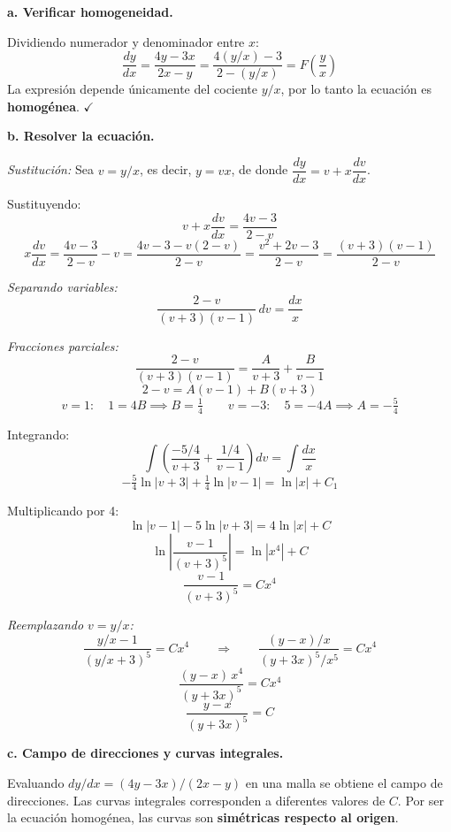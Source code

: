\begin{respuesta}

\textbf{a. Verificar homogeneidad.}

Dividiendo numerador y denominador entre $x$:
\[
    \frac{dy}{dx} = \frac{4y - 3x}{2x - y}
    = \frac{4(y/x) - 3}{2 - (y/x)}
    = F\!\left(\frac{y}{x}\right)
\]
La expresión depende únicamente del cociente $y/x$, por lo tanto
la ecuación es \textbf{homogénea}. $\checkmark$

\medskip
\textbf{b. Resolver la ecuación.}

\textit{Sustitución:} Sea $v = y/x$, es decir, $y = vx$, de donde
$\dfrac{dy}{dx} = v + x\dfrac{dv}{dx}$.

Sustituyendo:
\[
    v + x\frac{dv}{dx} = \frac{4v - 3}{2 - v}
\]
\[
    x\frac{dv}{dx} = \frac{4v-3}{2-v} - v
    = \frac{4v - 3 - v(2-v)}{2-v}
    = \frac{v^2 + 2v - 3}{2 - v}
    = \frac{(v+3)(v-1)}{2-v}
\]

\textit{Separando variables:}
\[
    \frac{2-v}{(v+3)(v-1)}\,dv = \frac{dx}{x}
\]

\textit{Fracciones parciales:}
\[
    \frac{2-v}{(v+3)(v-1)} = \frac{A}{v+3} + \frac{B}{v-1}
\]
\[
    2-v = A(v-1) + B(v+3)
\]
\[
    v=1:\quad 1 = 4B \implies B = \tfrac{1}{4}
    \qquad
    v=-3:\quad 5 = -4A \implies A = -\tfrac{5}{4}
\]

Integrando:
\[
    \int\!\left(\frac{-5/4}{v+3} + \frac{1/4}{v-1}\right)dv = \int\frac{dx}{x}
\]
\[
    -\tfrac{5}{4}\ln|v+3| + \tfrac{1}{4}\ln|v-1| = \ln|x| + C_1
\]

Multiplicando por 4:
\[
    \ln|v-1| - 5\ln|v+3| = 4\ln|x| + C
\]
\[
    \ln\!\left|\frac{v-1}{(v+3)^5}\right| = \ln\!\left|x^4\right| + C
\]
\[
    \frac{v-1}{(v+3)^5} = Cx^4
\]

\textit{Reemplazando $v = y/x$:}
\[
    \frac{y/x - 1}{(y/x + 3)^5} = Cx^4
\qquad\Longrightarrow\qquad
    \frac{(y-x)/x}{(y+3x)^5/x^5} = Cx^4
\]
\[
    \frac{(y-x)\,x^4}{(y+3x)^5} = Cx^4
\]
\[
    \boxed{\frac{y - x}{(y + 3x)^5} = C}
\]

\medskip
\textbf{c. Campo de direcciones y curvas integrales.}

Evaluando $dy/dx = (4y-3x)/(2x-y)$ en una malla se obtiene el campo de
direcciones. Las curvas integrales corresponden a diferentes valores de $C$.
Por ser la ecuación homogénea, las curvas son \textbf{simétricas respecto
al origen}.

\end{respuesta}
